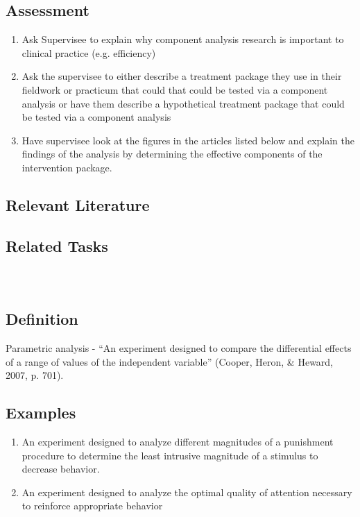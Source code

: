 \subsection{Assessment}
\begin{enumerate}
\item Ask Supervisee to explain why component analysis research is important to clinical practice (e.g. efficiency)
\item Ask the supervisee to either describe a treatment package they use in their fieldwork or practicum that could that could be tested via a component analysis or have them describe a hypothetical treatment package that could be tested via a component analysis 
\item Have supervisee look at the figures in the articles listed below and explain the findings of the analysis by determining the effective components of the intervention package.
\end{enumerate}
%
\subsection{Relevant Literature}
\begin{refsection}
\nocite{cooper2007applied,hardesty2014effects,ward2010component,ward2012component}
\printbibliography[heading=none]
\end{refsection}
%
\subsection{Related Tasks} 
\fourbThree{}\\
%
%
%
%
%
%
%
%
\section[\fourbEleven{}]{\fourbEleven{}%
              }
\subsection{Definition}
Parametric analysis - ``An experiment designed to compare the differential effects of a range of values of the independent variable'' (Cooper, Heron, \& Heward, 2007, p. 701).
%
\subsection{Examples}
\begin{enumerate}
\item An experiment designed to analyze different magnitudes of a punishment procedure to determine the least intrusive magnitude of a stimulus to decrease behavior.
\item An experiment designed to analyze the optimal quality of attention necessary to reinforce appropriate behavior 
\end{enumerate}
%

